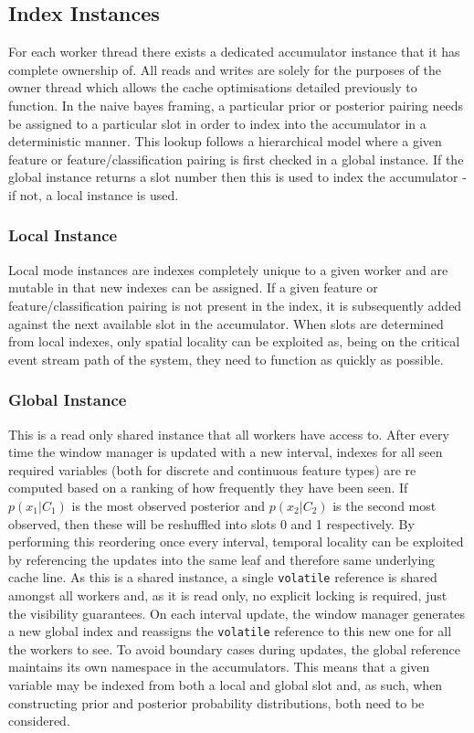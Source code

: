\documentclass[a4paper,11pt]{scrreprt}
\begin{document}
\subsection{Index Instances}
For each worker thread there exists a dedicated accumulator instance that it has complete ownership of. All reads and writes are solely for the purposes of the owner thread which allows the cache optimisations detailed previously to function. In the naive bayes framing, a particular prior or posterior pairing needs be assigned to a particular slot in order to index into the accumulator in a deterministic manner. This lookup follows a hierarchical model where a given feature or feature/classification pairing is first checked in a global instance. If the global instance returns a slot number then this is used to index the accumulator - if not, a local instance is used.
\subsubsection{Local Instance}
Local mode instances are indexes completely unique to a given worker and are mutable in that new indexes can be assigned. If a given feature or feature/classification pairing is not present in the index, it is subsequently added against the next available slot in the accumulator. When slots are determined from local indexes, only spatial locality can be exploited as, being on the critical event stream path of the system, they need to function as quickly as possible.
\subsubsection{Global Instance}
This is a read only shared instance that all workers have access to. After every time the window manager is updated with a new interval, indexes for all seen required variables (both for discrete and continuous feature types) are re computed based on a ranking of how frequently they have been seen. If \(p(x_1 | C_1)\) is the most observed posterior and \(p(x_2 | C_2)\) is the second most observed, then these will be reshuffled into slots 0 and 1 respectively. By performing this reordering once every interval, temporal locality can be exploited by referencing the updates into the same leaf and therefore same underlying cache line. As this is a shared instance, a single \texttt{volatile} reference is shared amongst all workers and, as it is read only, no explicit locking is required, just the visibility guarantees. On each interval update, the window manager generates a new global index and reassigns the \texttt{volatile} reference to this new one for all the workers to see. To avoid boundary cases during updates, the global reference maintains its own namespace in the accumulators. This means that a given variable may be indexed from both a local and global slot and, as such, when constructing prior and posterior probability distributions, both need to be considered.
\end{document}
